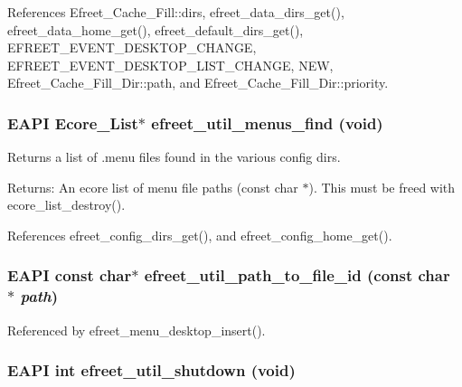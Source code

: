 References Efreet\_\-Cache\_\-Fill::dirs, efreet\_\-data\_\-dirs\_\-get(), efreet\_\-data\_\-home\_\-get(), efreet\_\-default\_\-dirs\_\-get(), EFREET\_\-EVENT\_\-DESKTOP\_\-CHANGE, EFREET\_\-EVENT\_\-DESKTOP\_\-LIST\_\-CHANGE, NEW, Efreet\_\-Cache\_\-Fill\_\-Dir::path, and Efreet\_\-Cache\_\-Fill\_\-Dir::priority.
\subsubsection{\setlength{\rightskip}{0pt plus 5cm}EAPI Ecore\_\-List$\ast$ efreet\_\-util\_\-menus\_\-find (void)}\label{efreet__utils_8h_adad7835d4a548070d11f093a900513d}


Returns a list of .menu files found in the various config dirs. \begin{Desc}
\item[Returns:]An ecore list of menu file paths (const char $\ast$). This must be freed with ecore\_\-list\_\-destroy(). \end{Desc}


References efreet\_\-config\_\-dirs\_\-get(), and efreet\_\-config\_\-home\_\-get().
\subsubsection{\setlength{\rightskip}{0pt plus 5cm}EAPI const char$\ast$ efreet\_\-util\_\-path\_\-to\_\-file\_\-id (const char $\ast$ {\em path})}\label{efreet__utils_8h_e499b43f751ef5d682a480b68ef07d4e}




Referenced by efreet\_\-menu\_\-desktop\_\-insert().
\subsubsection{\setlength{\rightskip}{0pt plus 5cm}EAPI int efreet\_\-util\_\-shutdown (void)}\label{efreet__utils_8h_3abde568cd48dbea047fbbe2e5d8da10}





